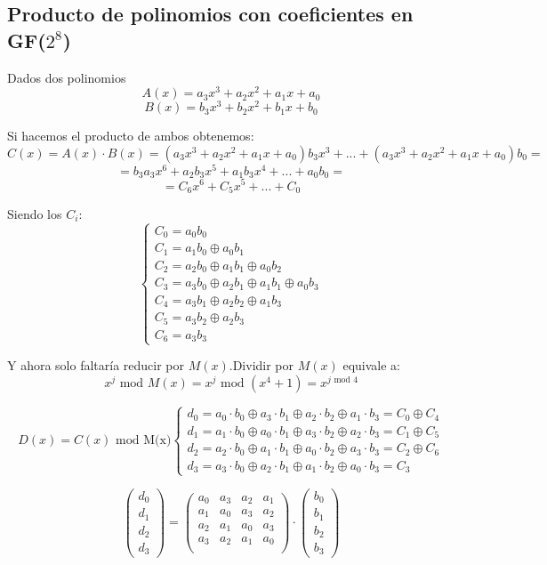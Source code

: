 \subsection{Producto de polinomios con coeficientes en GF($2^8$)}
 
 Dados dos polinomios
 $$A(x) = a_3x^3 + a_2x^2 + a_1x + a_0$$
 $$B(x) = b_3x^3 + b_2x^2 + b_1x + b_0$$
 
 Si hacemos el producto de ambos obtenemos:
 $$C(x) = A(x) \cdot B(x) =(a_3x^3 + a_2x^2 + a_1x + a_0)b_3x^3 +...+(a_3x^3 + a_2x^2 + a_1x + a_0)b_0 = $$
 $$= b_3a_3x^6 + a_2b_3x^5 + a_1b_3x^4 +...+ a_0b_0 = $$
 $$= C_6x^6 + C_5x^5 +...+ C_0$$
 
 Siendo los $C_i$:
 $$\begin{cases}
	 C_0 = a_0b_0\\
	 C_1 = a_1b_0 \oplus a_0b_1\\
	 C_2 = a_2b_0 \oplus a_1b_1 \oplus a_0b_2\\
	 C_3 = a_3b_0 \oplus a_2b_1 \oplus a_1b_1 \oplus a_0b_3\\
	 C_4 = a_3b_1 \oplus a_2b_2 \oplus a_1b_3\\
	 C_5 = a_3b_2 \oplus a_2b_3\\
	 C_6 = a_3b_3
 \end{cases}$$
 
Y ahora solo faltaría reducir por $M(x)$.Dividir por $M(x)$ equivale a:
$$x^j \text{ mod } M(x) = x^j \text{ mod } (x^4 +1) = x^{j \text{ mod } 4}$$ 

 $$D(x) = C(x) \text{ mod M(x)} \begin{cases}
 d_0 = a_0\cdot b_0 \oplus a_3 \cdot b_1 \oplus a_2 \cdot b_2 \oplus a_1 \cdot b_3 = C_0 \oplus C_4\\
 d_1 = a_1\cdot b_0 \oplus a_0 \cdot b_1 \oplus a_3 \cdot b_2 \oplus a_2 \cdot b_3 = C_1 \oplus C_5\\
 d_2 = a_2\cdot b_0 \oplus a_1 \cdot b_1 \oplus a_0 \cdot b_2 \oplus a_3 \cdot b_3 = C_2 \oplus C_6\\
 d_3 = a_3\cdot b_0 \oplus a_2 \cdot b_1 \oplus a_1 \cdot b_2 \oplus a_0 \cdot b_3 = C_3
 \end{cases}$$
 
 $$\left(\begin{matrix}
 d_0\\d_1\\d_2\\d_3
 \end{matrix} \right) = \left(\begin{matrix}
 a_0 & a_3 & a_2 & a_1\\
 a_1 & a_0 & a_3 & a_2\\
 a_2 & a_1 & a_0 & a_3\\
 a_3 & a_2 & a_1 & a_0\\
 \end{matrix}\right) \cdot \left( \begin{matrix}
 b_0\\
 b_1\\
 b_2\\
 b_3
 \end{matrix}\right)$$
 
